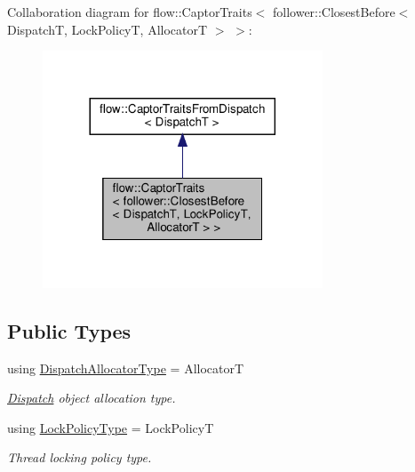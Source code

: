 Collaboration diagram for flow\+:\+:Captor\+Traits$<$ follower\+:\+:Closest\+Before$<$ DispatchT, Lock\+PolicyT, AllocatorT $>$ $>$\+:\nopagebreak
\begin{figure}[H]
\begin{center}
\leavevmode
\includegraphics[width=236pt]{structflow_1_1_captor_traits_3_01follower_1_1_closest_before_3_01_dispatch_t_00_01_lock_policy_t4a377ecd3742865b03332727ba72decc}
\end{center}
\end{figure}
\subsection*{Public Types}
\begin{DoxyCompactItemize}
\item 
\mbox{\label{structflow_1_1_captor_traits_3_01follower_1_1_closest_before_3_01_dispatch_t_00_01_lock_policy_t_00_01_allocator_t_01_4_01_4_ab573c7e6d6e19572fa6a8a6c4349800d}} 
using \hyperlink{structflow_1_1_captor_traits_3_01follower_1_1_closest_before_3_01_dispatch_t_00_01_lock_policy_t_00_01_allocator_t_01_4_01_4_ab573c7e6d6e19572fa6a8a6c4349800d}{Dispatch\+Allocator\+Type} = AllocatorT
\begin{DoxyCompactList}\small\item\em \hyperlink{classflow_1_1_dispatch}{Dispatch} object allocation type. \end{DoxyCompactList}\item 
\mbox{\label{structflow_1_1_captor_traits_3_01follower_1_1_closest_before_3_01_dispatch_t_00_01_lock_policy_t_00_01_allocator_t_01_4_01_4_a842c134bbe1fbe67ef80b3a88a6e2314}} 
using \hyperlink{structflow_1_1_captor_traits_3_01follower_1_1_closest_before_3_01_dispatch_t_00_01_lock_policy_t_00_01_allocator_t_01_4_01_4_a842c134bbe1fbe67ef80b3a88a6e2314}{Lock\+Policy\+Type} = Lock\+PolicyT
\begin{DoxyCompactList}\small\item\em Thread locking policy type. \end{DoxyCompactList}\end{DoxyCompactItemize}


